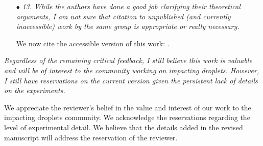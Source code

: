 \documentclass[]{article}
\begin{document}
\begin{enumerate}
	\item[$\bullet$] \textit{13. While the authors have done a good job clarifying their theoretical arguments, I am not sure that citation to unpublished (and currently inaccessible) work by the same group is appropriate or really necessary.}
	
	We now cite the accessible version of this work: \citet{sanjay2024PRL}.
	
\end{enumerate}

\textit{Regardless of the remaining critical feedback, I still believe this work is valuable and will be of interest to the community working on impacting droplets. However, I still have reservations on the current version given the persistent lack of details on the experiments.}

We appreciate the reviewer's belief in the value and interest of our work to the impacting droplets community. We acknowledge the reservations regarding the level of experimental detail. We believe that the details added in the revised manuscript will address the reservation of the reviewer. 
	
\printbibliography[title=References]
\end{document}
